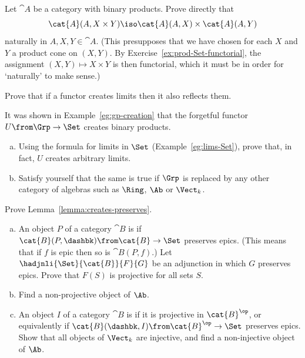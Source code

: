 \begin{question}
Let $\cat{A}$ be a category with binary products.  Prove directly that 
\[
\cat{A}(A, X \times Y)
\iso 
\cat{A}(A, X) \times \cat{A}(A, Y)
\]
naturally in $A, X, Y \in \cat{A}$.  (This presupposes that we have chosen
for each $X$ and $Y$ a product cone on $(X, Y)$.  By
Exercise~\ref{ex:prod-Set-functorial}, the assignment $(X, Y) \mapsto X
\times Y$ is then functorial, which it must be in order for `naturally' to
make sense.)
\end{question}


\begin{question}
Prove that if a functor creates limits then it also reflects them. 
\end{question}


\begin{question}        
\label{ex:fgt-create}
It was shown in Example~\ref{eg:gp-creation} that the forgetful functor
$U\from \Grp \to \Set$%
%
%
creates binary products.
% 
\begin{enumerate}[(b)]
\item
Using the formula for limits in $\Set$ (Example~\ref{eg:lims-Set}), prove
that, in fact, $U$ creates arbitrary limits.

\item
Satisfy yourself that the same is true if $\Grp$ is replaced by any other
category of algebras such as $\Ring$,%
%
%
$\Ab$ or $\Vect_k$.%
%
%
\end{enumerate}
\end{question}


\begin{question}        
\label{ex:creates-preserves}
Prove Lemma~\ref{lemma:creates-preserves}.
\end{question}


\begin{question}
\begin{enumerate}[(b)]
\item 
An object $P$ of a category $\cat{B}$ is %
%
%
%
if $\cat{B}(P, \dashbk) \from \cat{B} \to \Set$ preserves epics.  (This
means that if $f$ is epic then so is $\cat{B}(P, f)$.)  Let
$\hadjnli{\Set}{\cat{B}}{F}{G}$ be an adjunction in which $G$ preserves
epics.  Prove that $F(S)$ is projective for all sets $S$.

\item 
Find a non-projective object of $\Ab$.

\item 
An object $I$ of a category $\cat{B}$ is %
%
%
%
if it is projective in $\cat{B}^\op$, or equivalently if $\cat{B}(\dashbk,
I)\from \cat{B}^\op \to \Set$ preserves epics.  Show that all objects of
$\Vect_k$ are injective, and find a non-injective object of $\Ab$.
\end{enumerate}
\end{question}



